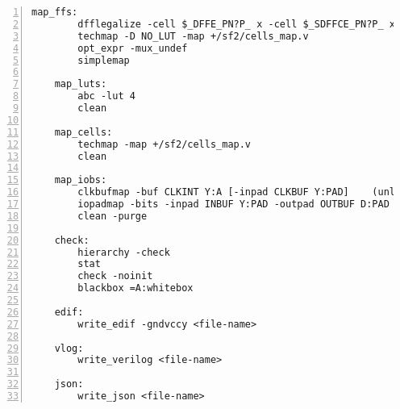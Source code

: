 \begin{lstlisting}[numbers=left,frame=single]
    map_ffs:
        dfflegalize -cell $_DFFE_PN?P_ x -cell $_SDFFCE_PN?P_ x -cell $_DLATCH_PN?_ x
        techmap -D NO_LUT -map +/sf2/cells_map.v
        opt_expr -mux_undef
        simplemap

    map_luts:
        abc -lut 4
        clean

    map_cells:
        techmap -map +/sf2/cells_map.v
        clean

    map_iobs:
        clkbufmap -buf CLKINT Y:A [-inpad CLKBUF Y:PAD]    (unless -noiobs, -inpad only passed if -clkbuf)
        iopadmap -bits -inpad INBUF Y:PAD -outpad OUTBUF D:PAD -toutpad TRIBUFF E:D:PAD -tinoutpad BIBUF E:Y:D:PAD    (unless -noiobs)
        clean -purge

    check:
        hierarchy -check
        stat
        check -noinit
        blackbox =A:whitebox

    edif:
        write_edif -gndvccy <file-name>

    vlog:
        write_verilog <file-name>

    json:
        write_json <file-name>
\end{lstlisting}

